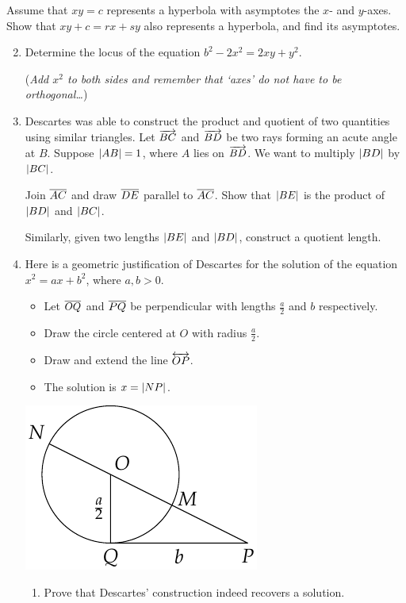 \begin{exercises}{}{}
\exstart %
Assume that $xy=c$ represents a hyperbola with asymptotes the $x$- and $y$-axes. Show that $xy+c=rx+sy$ also represents a hyperbola, and find its asymptotes.
\begin{enumerate}\setcounter{enumi}{1}
  \item%
  Determine the locus of the equation $b^2-2x^2=2xy+y^2$.\par
  (\emph{Add $x^2$ to both sides and remember that `axes' do not have to be orthogonal\ldots})
  
  \item%
  Descartes was able to construct the product and quotient of two quantities using similar triangles. Let $\overrightarrow{BC}$ and $\overrightarrow{BD}$ be two rays forming an acute angle at $B$. Suppose $\left| AB\right|=1$, where $A$ lies on $\overrightarrow{BD}$. We want to multiply $\left| BD\right|$ by $\left| BC\right|$.\par
  Join $\overline{AC}$ and draw $\overline{DE}$ parallel to $\overline{AC}$. Show that $\left| BE\right|$ is the product of $\left| BD\right|$ and $\left| BC\right|$.\par
  Similarly, given two lengths $\left| BE\right|$ and $\left| BD\right|$, construct a quotient length.
  
  \item Here is a geometric justification of Descartes for the solution of the equation $x^2=ax+b^2$, where $a,b>0$.
  \par
	\begin{minipage}[t]{0.6\linewidth}\vspace{-5pt}
	\begin{itemize}\itemsep0pt
	  \item Let $\overline{OQ}$ and $\overline{PQ}$ be perpendicular with lengths $\frac a2$ and $b$ respectively.
	  \item Draw the circle centered at $O$ with radius $\frac a2$.
	  \item Draw and extend the line $\overleftrightarrow{OP}$.
	  \item The solution is $x=\left| NP\right|$.
	\end{itemize}
	\end{minipage}\hfill\begin{minipage}[t]{0.35\linewidth}\vspace{-10pt}
	\includegraphics{descartes-quad}
	\end{minipage}\par
	\begin{enumerate}
	  \item Prove that Descartes' construction indeed recovers a solution.
  

\end{enumerate}
\end{enumerate}
\end{exercises}
